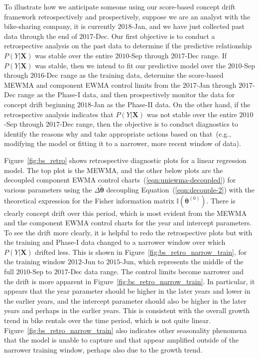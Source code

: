 \documentclass[twoside,11pt]{article}
\begin{document}
To illustrate how we anticipate someone using our score-based concept drift framework retrospectively and prospectively, suppose we are an analyst with the bike-sharing company, it is currently $2018$-Jan, and we have just collected past data through the end of $2017$-Dec. Our first objective is to conduct a retrospective analysis on the past data to determine if the predictive relationship $P(Y|\bm{X})$ was stable over the entire $2010$-Sep through $2017$-Dec range. If $P(Y|\bm{X})$ was stable, then we intend to fit our predictive model over the $2010$-Sep through $2016$-Dec range as the training data, determine the score-based MEWMA and component EWMA control limits from the $2017$-Jan through $2017$-Dec range as the Phase-I data, and then prospectively monitor the data for concept drift beginning $2018$-Jan as the Phase-II data. On the other hand, if the retrospective analysis indicates that $P(Y|\bm{X})$ was not stable over the entire $2010$-Sep through $2017$-Dec range, then the objective is to conduct diagnostics to identify the reasons why and take appropriate actions based on that~(e.g., modifying the model or fitting it to a narrower, more recent window of data).

Figure~\ref{fig:bs_retro} shows retrospective diagnostic plots for a linear regression model. The top plot is the MEWMA, and the other below plots are the decoupled component EWMA control charts~(\ref{eqn:uniewma-decoupled}) for various parameters using the $\Delta \tilde{\bm { \theta}}$ decoupling Equation~(\ref{eqn:decouple-2}) with the theoretical expression for the Fisher information matrix $\mathbb {I}(\bm { \theta}^{ (0)})$. There is clearly concept drift over this period, which is most evident from the MEWMA and the component EWMA control charts for the year and intercept parameters. To see the drift more clearly, it is helpful to redo the retrospective plots but with the training and Phase-I data changed to a narrower window over which $P(Y|\bm{X})$ drifted less. This is shown in Figure~\ref{fig:bs_retro_narrow_train}, for the training window $2012$-Jun to $2015$-Jun, which represents the middle of the full $2010$-Sep to $2017$-Dec data range. The control limits become narrower and the drift is more apparent in Figure~\ref{fig:bs_retro_narrow_train}. In particular, it appears that the year parameter should be higher in the later years and lower in the earlier years, and the intercept parameter should also be higher in the later years and perhaps in the earlier years. This is consistent with the overall growth trend in bike rentals over the time period, which is not quite linear. Figure~\ref{fig:bs_retro_narrow_train} also indicates other seasonality phenomena that the model is unable to capture and that appear amplified outside of the narrower training window, perhaps also due to the growth trend.  
\end{document}
